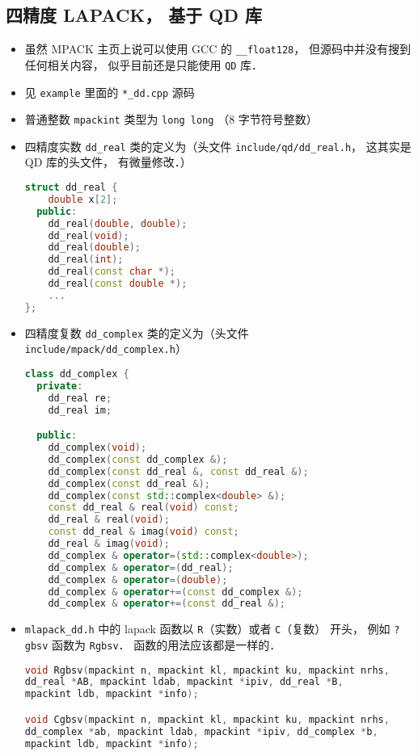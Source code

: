 \subsection{四精度 LAPACK， 基于 QD 库}
\begin{itemize}
\item 虽然 MPACK 主页上说可以使用 GCC 的 \verb|__float128|， 但源码中并没有搜到任何相关内容， 似乎目前还是只能使用 \verb|QD| 库．
\item 见 \verb|example| 里面的 \verb|*_dd.cpp| 源码
\item 普通整数 \verb|mpackint| 类型为 \verb|long long| （8 字节符号整数）
\item 四精度实数 \verb|dd_real| 类的定义为（头文件 \verb|include/qd/dd_real.h|， 这其实是 QD 库的头文件， 有微量修改．）
\begin{lstlisting}[language=cpp]
struct dd_real {
    double x[2];
  public:
    dd_real(double, double);
    dd_real(void);
    dd_real(double);
    dd_real(int);
    dd_real(const char *);
    dd_real(const double *);
    ...
};
\end{lstlisting}
\item 四精度复数 \verb|dd_complex| 类的定义为（头文件 \verb|include/mpack/dd_complex.h|）
\begin{lstlisting}[language=cpp]
class dd_complex {
  private:
    dd_real re;
    dd_real im;

  public:
    dd_complex(void);
    dd_complex(const dd_complex &);
    dd_complex(const dd_real &, const dd_real &);
    dd_complex(const dd_real &);
    dd_complex(const std::complex<double> &);
    const dd_real & real(void) const;
    dd_real & real(void);
    const dd_real & imag(void) const;
    dd_real & imag(void);
    dd_complex & operator=(std::complex<double>);
    dd_complex & operator=(dd_real);
    dd_complex & operator=(double);
    dd_complex & operator+=(const dd_complex &);
    dd_complex & operator+=(const dd_real &);
\end{lstlisting}
\item \verb|mlapack_dd.h| 中的 lapack 函数以 \verb|R|（实数）或者 \verb|C|（复数） 开头， 例如 \verb|?gbsv| 函数为 \verb|Rgbsv|． 函数的用法应该都是一样的．
\begin{lstlisting}[language=cpp]
void Rgbsv(mpackint n, mpackint kl, mpackint ku, mpackint nrhs,
dd_real *AB, mpackint ldab, mpackint *ipiv, dd_real *B,
mpackint ldb, mpackint *info);

void Cgbsv(mpackint n, mpackint kl, mpackint ku, mpackint nrhs,
dd_complex *ab, mpackint ldab, mpackint *ipiv, dd_complex *b,
mpackint ldb, mpackint *info);
\end{lstlisting}
\end{itemize}
